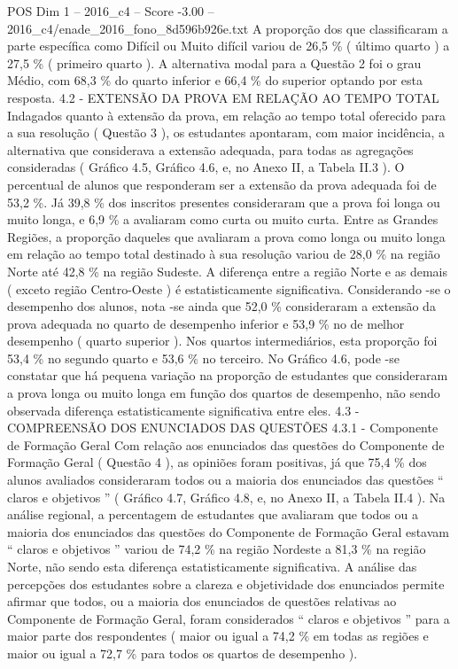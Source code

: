 \begin{textsample}{POS Dim 1 – 2016\_c4 – Score -3.00 – 2016\_c4/enade\_2016\_fono\_8d596b926e.txt}
A proporção dos que classificaram a parte específica como Difícil ou Muito difícil variou de 26,5 \% ( último quarto ) a 27,5 \% ( primeiro quarto ).
A alternativa modal para a Questão 2 foi o grau Médio, com 68,3 \% do quarto inferior e 66,4 \% do superior optando por esta resposta. 4.2 - EXTENSÃO DA PROVA EM RELAÇÃO AO TEMPO TOTAL Indagados quanto à extensão da prova, em relação ao tempo total oferecido para a sua resolução ( Questão 3 ), os estudantes apontaram, com maior incidência, a alternativa que considerava a extensão adequada, para todas as agregações consideradas ( Gráfico 4.5, Gráfico 4.6, e, no Anexo II, a Tabela II.3 ).
O percentual de alunos que responderam ser a extensão da prova adequada foi de 53,2 \%.
Já 39,8 \% dos inscritos presentes consideraram que a prova foi longa ou muito longa, e 6,9 \% a avaliaram como curta ou muito curta.
Entre as Grandes Regiões, a proporção daqueles que avaliaram a prova como longa ou muito longa em relação ao tempo total destinado à sua resolução variou de 28,0 \% na região Norte até 42,8 \% na região Sudeste.
A diferença entre a região Norte e as demais ( exceto região Centro-Oeste ) é estatisticamente significativa.
Considerando -se o desempenho dos alunos, nota -se ainda que 52,0 \% consideraram a extensão da prova adequada no quarto de desempenho inferior e 53,9 \% no de melhor desempenho ( quarto superior ).
Nos quartos intermediários, esta proporção foi 53,4 \% no segundo quarto e 53,6 \% no terceiro.
No Gráfico 4.6, pode -se constatar que há pequena variação na proporção de estudantes que consideraram a prova longa ou muito longa em função dos quartos de desempenho, não sendo observada diferença estatisticamente significativa entre eles. 4.3 - COMPREENSÃO DOS ENUNCIADOS DAS QUESTÕES 4.3.1 - Componente de Formação Geral Com relação aos enunciados das questões do Componente de Formação Geral ( Questão 4 ), as opiniões foram positivas, já que 75,4 \% dos alunos avaliados consideraram todos ou a maioria dos enunciados das questões “ claros e objetivos ” ( Gráfico 4.7, Gráfico 4.8, e, no Anexo II, a Tabela II.4 ).
Na análise regional, a percentagem de estudantes que avaliaram que todos ou a maioria dos enunciados das questões do Componente de Formação Geral estavam “ claros e objetivos ” variou de 74,2 \% na região Nordeste a 81,3 \% na região Norte, não sendo esta diferença estatisticamente significativa.
A análise das percepções dos estudantes sobre a clareza e objetividade dos enunciados permite afirmar que todos, ou a maioria dos enunciados de questões relativas ao Componente de Formação Geral, foram considerados “ claros e objetivos ” para a maior parte dos respondentes ( maior ou igual a 74,2 \% em todas as regiões e maior ou igual a 72,7 \% para todos os quartos de desempenho ).

\end{textsample}
